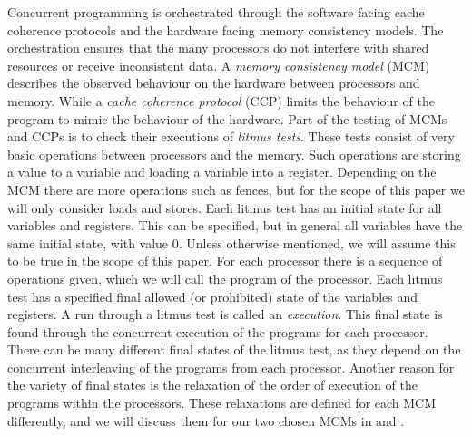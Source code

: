\documentclass[runningheads]{llncs}
\begin{document}
Concurrent programming is orchestrated through the software facing cache coherence protocols and the hardware facing memory consistency models.
The orchestration ensures that the many processors do not interfere with shared resources or receive inconsistent data.
A \emph{memory consistency model} (MCM) describes the observed behaviour on the hardware between  processors and memory.
While a \emph{cache coherence protocol} (CCP) limits the behaviour of the program to mimic the behaviour of the hardware.
Part of the testing of MCMs and CCPs is to check their executions of \emph{litmus tests}.
These tests consist of very basic operations between processors and the memory.
Such operations are storing a value to a variable and loading a variable into a register.
Depending on the MCM there are more operations such as fences, but for the scope of this paper we will only consider loads and stores.
Each litmus test has an initial state for all variables and registers.
This can be specified, but in general all variables have the same initial state, with value 0.
Unless otherwise mentioned, we will assume this to be true in the scope of this paper.
For each processor there is a sequence of operations given, which we will call the program of the processor.
Each litmus test has a specified final allowed (or prohibited) state of the variables and registers.
A run through a litmus test is called an \emph{execution}.
This final state is found through the concurrent execution of the programs for each processor.
There can be many different final states of the litmus test, as they depend on the concurrent interleaving of the programs from each processor.
Another reason for the variety of final states is the relaxation of the order of execution of the programs within the processors.
These relaxations are defined for each MCM differently, and we will discuss them for our two chosen MCMs in  and .
\end{document}

